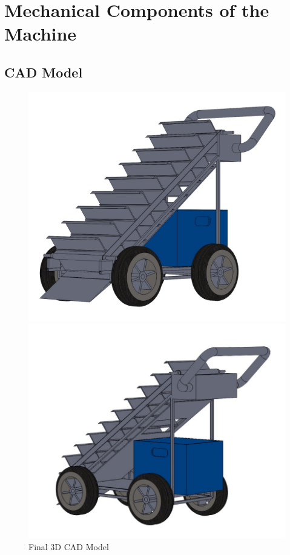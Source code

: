 \chapter{Mechanical Components of the Machine} \label{Mechanical Components of the Machine}
\section{CAD Model} \label{CAD Model}

\begin{figure}[H]
  \centering
    \begin{minipage}{0.40\textwidth}
    \centering
      \includegraphics[width=1\textwidth]{cad 2.PNG}

    \end{minipage}
    \begin{minipage}{0.40\textwidth}
    \centering
      \includegraphics[width=1\textwidth]{cad 1.PNG}
     \end{minipage}
    \caption{Final 3D CAD Model}
\end{figure}

